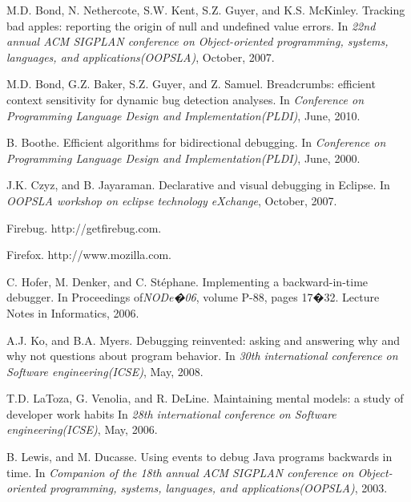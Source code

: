 \documentclass[preprint]{sigplanconf}
\begin{document}
\begin{thebibliography}{13}
\softraggedright

M.D. Bond, N. Nethercote, S.W. Kent, S.Z. Guyer, and K.S. McKinley. \newblock Tracking bad apples: reporting the origin of null and undefined value errors.
\newblock In \emph{22nd annual ACM SIGPLAN conference on Object-oriented programming, systems, languages, and applications(OOPSLA)},
October, 2007.

M.D. Bond, G.Z. Baker, S.Z. Guyer, and Z. Samuel. \newblock Breadcrumbs: efficient context sensitivity for dynamic bug detection analyses.
\newblock In \emph{Conference on Programming Language Design and Implementation(PLDI)},
June, 2010.

B. Boothe. \newblock Efficient algorithms for bidirectional debugging.
\newblock In \emph{Conference on Programming Language Design and Implementation(PLDI)},
June, 2000.

J.K. Czyz, and B. Jayaraman. \newblock Declarative and visual debugging in Eclipse.
\newblock In \emph{OOPSLA workshop on eclipse technology eXchange},
October, 2007.

Firebug. \newblock http://getfirebug.com.

Firefox. \newblock http://www.mozilla.com.

C. Hofer, M. Denker, and C. St\'{e}phane. \newblock Implementing a backward-in-time debugger.
\newblock In Proceedings of\emph{NODe�06},
volume P-88, pages 17�32. Lecture Notes in Informatics, 2006.

A.J. Ko, and B.A. Myers. \newblock Debugging reinvented: asking and answering why and why not questions about program behavior.
\newblock In \emph{30th international conference on Software engineering(ICSE)},
May, 2008.

T.D. LaToza, G. Venolia, and R. DeLine. \newblock Maintaining mental models: a study of developer work habits
\newblock In \emph{28th international conference on Software engineering(ICSE)},
May, 2006.

B. Lewis, and M. Ducasse. \newblock Using events to debug Java programs backwards in time.
\newblock In \emph{Companion of the 18th annual ACM SIGPLAN conference on Object-oriented programming, systems, languages, and applications(OOPSLA)},
2003.


\end{thebibliography}
\end{document}

